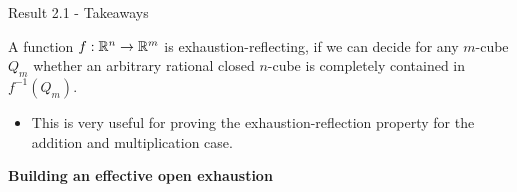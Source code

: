 \begin{frame}{Result 2.1 - Takeaways }
    \pause
    \begin{minipage}[t]{0.45\linewidth}
    \vspace{-2.5em}
    \begin{theorem}
        A function $f:\mathbb{R}^n \to\mathbb{R}^m$ is exhaustion-reflecting, if we can decide for any $m$-cube $Q_m$ whether an arbitrary rational closed $n$-cube is completely contained in $f^{-1}(Q_m)$.
    \end{theorem}
    \pause
    \begin{itemize}
        \item This is very useful for proving the exhaustion-reflection property for the addition and multiplication case.
    \end{itemize}

    \end{minipage}
    \hspace{0.1em}
    \begin{minipage}[t]{0.5\linewidth}
        \pause
        \vspace{-1em}
        \color{Mahogany}
        \begin{centering}
        \textbf{Building an effective open exhaustion\\}
        \end{centering}


\end{minipage}
\end{frame}
